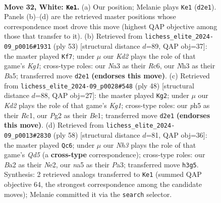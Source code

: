 \documentclass[11pt]{article}
\begin{document}
\begin{figure}[p]\centering
\begin{subfigure}{0.46\textwidth}\centering
\resizebox{\linewidth}{!}{%
\newchessgame
\chessboard[
  setfen={3qn2r/5pk1/p5p1/n1Q1p2p/P3P1b1/N1PP3N/B2K1PPP/R7 w - - 3 32},
  showmover=false,
  pgfstyle=straightmove, color=movearrow, markmove={d2-e1}
]}
\caption{}
\end{subfigure}\hfill
\begin{subfigure}{0.46\textwidth}\centering
\resizebox{\linewidth}{!}{%
\newchessgame
\chessboard[
  setfen={6k1/6pp/p1rqpp2/bp6/n2P1NQP/P3P3/5PP1/B4RK1 b - - 5 27},
  showmover=false,
  pgfstyle=straightmove, color=movearrow, markmove={g8-f7}
]}
\caption{}
\end{subfigure}
\\[4pt]
\begin{subfigure}{0.46\textwidth}\centering
\resizebox{\linewidth}{!}{%
\newchessgame
\chessboard[
  setfen={3r2k1/1p3pp1/pbp1nnp1/4q3/1PB5/P1N1P1PP/2Q2P2/2R1B1K1 w - - 1 25},
  showmover=false,
  pgfstyle=straightmove, color=movearrow, markmove={g1-g2}
]}
\caption{}
\end{subfigure}\hfill
\begin{subfigure}{0.46\textwidth}\centering
\resizebox{\linewidth}{!}{%
\newchessgame
\chessboard[
  setfen={3r1nk1/4qpnp/6p1/p1NQP3/1p3P2/P6P/1P2N1P1/R6K w - - 1 30},
  showmover=false,
  pgfstyle=straightmove, color=movearrow, markmove={d5-c6}
]}
\caption{}
\end{subfigure}
\caption{\textbf{Move 32, White: \texttt{Ke1}.} (a) Our position; Melanie plays \texttt{Ke1} (\texttt{d2e1}). Panels (b)--(d) are the retrieved master positions whose correspondence most drove this move (highest QAP objective among those that transfer to it). (b) Retrieved from \texttt{lichess\_elite\_2024-09\_p0016\#1931} (ply 53) [structural distance $d$=89, QAP obj=37]: the master played \texttt{Kf7}; under $\mu$ our \emph{Kd2} plays the role of that game's \emph{Kg1}; cross-type roles: our \emph{N}a3 as their \emph{R}c6, our \emph{N}h3 as their \emph{B}a5; transferred move \texttt{d2e1} \textbf{(endorses this move)}. (c) Retrieved from \texttt{lichess\_elite\_2024-09\_p0028\#548} (ply 48) [structural distance $d$=88, QAP obj=27]: the master played \texttt{Kg2}; under $\mu$ our \emph{Kd2} plays the role of that game's \emph{Kg1}; cross-type roles: our \emph{p}h5 as their \emph{R}c1, our \emph{P}g2 as their \emph{B}e1; transferred move \texttt{d2e1} \textbf{(endorses this move)}. (d) Retrieved from \texttt{lichess\_elite\_2024-09\_p0013\#2830} (ply 58) [structural distance $d$=81, QAP obj=36]: the master played \texttt{Qc6}; under $\mu$ our \emph{Nh3} plays the role of that game's \emph{Qd5} (a \textbf{cross-type} correspondence); cross-type roles: our \emph{B}a2 as their \emph{N}e2, our \emph{n}a5 as their \emph{P}a3; transferred move \texttt{h3g5}. Synthesis: 2 retrieved analogs transferred to \texttt{Ke1} (summed QAP objective 64, the strongest correspondence among the candidate moves); Melanie committed it via the \texttt{search} selector.}
\label{fig:thought-m62}
\end{figure}
\end{document}
